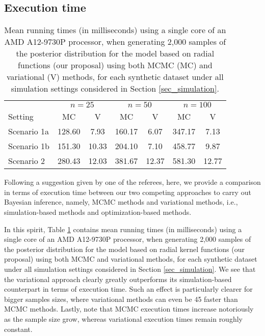 \documentclass[letterpaper,10pt,openany]{article}
\begin{document}
{\color{black}
\subsection{Execution time}


\begin{table}[!b]
	\centering
		\begin{tabular}{lcccccc}  
			\hline
			\multicolumn{1}{c}{} & \multicolumn{2}{c}{$n=25$} & \multicolumn{2}{c}{$n=50$} & \multicolumn{2}{c}{$n=100$} \\ \cmidrule{2-7}
			Setting & \textsf{MC} & \textsf{V} & \textsf{MC} & \textsf{V} & \textsf{MC} & \textsf{V} \\ 
			\hline
			Scenario 1a & 128.60 &  7.93 & 160.17 &  6.07 & 347.17 &  7.13  \\
			Scenario 1b & 151.30 & 10.33 & 204.10 &  7.10 & 458.77 &  9.87  \\
			Scenario 2  & 280.43 & 12.03 & 381.67 & 12.37 & 581.30 & 12.77  \\
			\hline
		\end{tabular}
	\caption{Mean running times (in milliseconds) using a single core of an AMD A12-9730P processor, when generating 2,000 samples of the posterior distribution for the model based on radial functions (our proposal) using both MCMC (\textsf{MC}) and variational (\textsf{V}) methods, for each synthetic dataset under all simulation settings considered in Section \ref{sec_simulation}.}\label{tab_times}
\end{table}


Following a suggestion given by one of the referees, here, we provide a comparison in terms of execution time between our two competing approaches to carry out Bayesian inference, namely, MCMC methods and variational methods, i.e., simulation-based methods and optimization-based methods.  


In this spirit, Table \ref{tab_times} contains mean running times (in milliseconds) using a single core of an AMD A12-9730P processor, when generating 2,000 samples of the posterior distribution for the model based on radial kernel functions (our proposal) using both MCMC and variational methods, for each synthetic dataset under all simulation settings considered in Section \ref{sec_simulation}.  We see that the variational approach clearly greatly outperforms its simulation-based counterpart in terms of execution time. Such an effect is particularly clearer for bigger samples sizes, where variational methods can even be 45 faster than MCMC methods. Lastly, note that	 MCMC execution times increase notoriously as the sample size grow, whereas variational execution times remain roughly constant.
}
\end{document}
